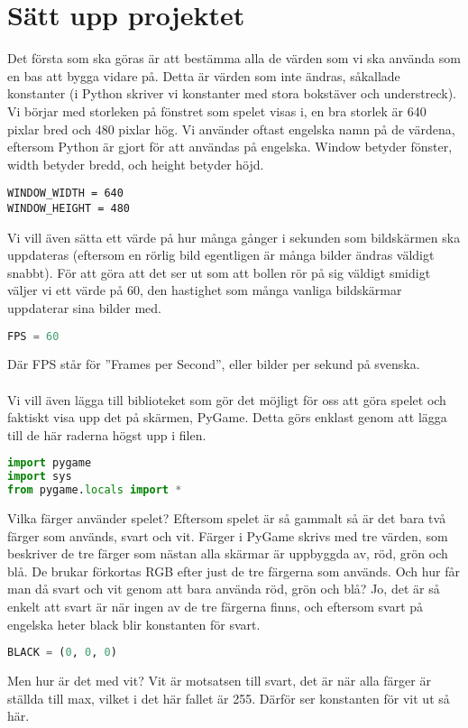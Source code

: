 \documentclass{article}
\begin{document}
\section{Sätt upp projektet}
Det första som ska göras är att bestämma alla de värden som vi ska använda som en bas att bygga vidare på. Detta är värden som inte ändras, såkallade konstanter (i Python skriver vi konstanter med stora bokstäver och understreck). Vi börjar med storleken på fönstret som spelet visas i, en bra storlek är 640 pixlar bred och 480 pixlar hög. Vi använder oftast engelska namn på de värdena, eftersom Python är gjort för att användas på engelska. Window betyder fönster, width betyder bredd, och height betyder höjd.
\begin{lstlisting}
WINDOW_WIDTH = 640
WINDOW_HEIGHT = 480
\end{lstlisting}
Vi vill även sätta ett värde på hur många gånger i sekunden som bildskärmen ska uppdateras (eftersom en rörlig bild egentligen är många bilder ändras väldigt snabbt). För att göra att det ser ut som att bollen rör på sig väldigt smidigt väljer vi ett värde på 60, den hastighet som många vanliga bildskärmar uppdaterar sina bilder med.
\begin{lstlisting}[language=Python]
FPS = 60
\end{lstlisting}
Där FPS står för ''Frames per Second'', eller bilder per sekund på svenska.\\
\\
Vi vill även lägga till biblioteket som gör det möjligt för oss att göra spelet och faktiskt visa upp det på skärmen, PyGame. Detta görs enklast genom att lägga till de här raderna högst upp i filen.
\begin{lstlisting}[language=Python]
import pygame
import sys
from pygame.locals import *
\end{lstlisting}
Vilka färger använder spelet? Eftersom spelet är så gammalt så är det bara två färger som används, svart och vit. Färger i PyGame skrivs med tre värden, som beskriver de tre färger som nästan alla skärmar är uppbyggda av, röd, grön och blå. De brukar förkortas RGB efter just de tre färgerna som används. Och hur får man då svart och vit genom att bara använda röd, grön och blå? Jo, det är så enkelt att svart är när ingen av de tre färgerna finns, och eftersom svart på engelska heter black blir konstanten för svart.
\begin{lstlisting}[language=Python]
BLACK = (0, 0, 0)
\end{lstlisting}
Men hur är det med vit? Vit är motsatsen till svart, det är när alla färger är ställda till max, vilket i det här fallet är 255. Därför ser konstanten för vit ut så här.
\end{document}
